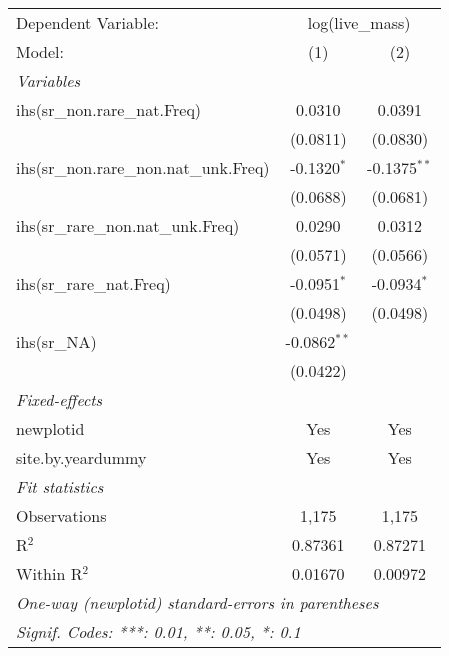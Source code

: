 \begin{tabular}{lcc}
\tabularnewline\midrule\midrule
Dependent Variable:&\multicolumn{2}{c}{log(live\_mass)}\\
Model:&(1) & (2)\\
\midrule \emph{Variables}&   &  \\
ihs(sr\_non.rare\_nat.Freq)&0.0310 & 0.0391\\
  &(0.0811) & (0.0830)\\
ihs(sr\_non.rare\_non.nat\_unk.Freq)&-0.1320$^{*}$ & -0.1375$^{**}$\\
  &(0.0688) & (0.0681)\\
ihs(sr\_rare\_non.nat\_unk.Freq)&0.0290 & 0.0312\\
  &(0.0571) & (0.0566)\\
ihs(sr\_rare\_nat.Freq)&-0.0951$^{*}$ & -0.0934$^{*}$\\
  &(0.0498) & (0.0498)\\
ihs(sr\_NA)&-0.0862$^{**}$ &   \\
  &(0.0422) &   \\
\midrule \emph{Fixed-effects}&   &  \\
newplotid & Yes & Yes\\
site.by.yeardummy & Yes & Yes\\
\midrule \emph{Fit statistics}&  & \\
Observations & 1,175&1,175\\
R$^2$ & 0.87361&0.87271\\
Within R$^2$ & 0.01670&0.00972\\
\midrule\midrule\multicolumn{3}{l}{\emph{One-way (newplotid) standard-errors in parentheses}}\\
\multicolumn{3}{l}{\emph{Signif. Codes: ***: 0.01, **: 0.05, *: 0.1}}\\
\end{tabular}


